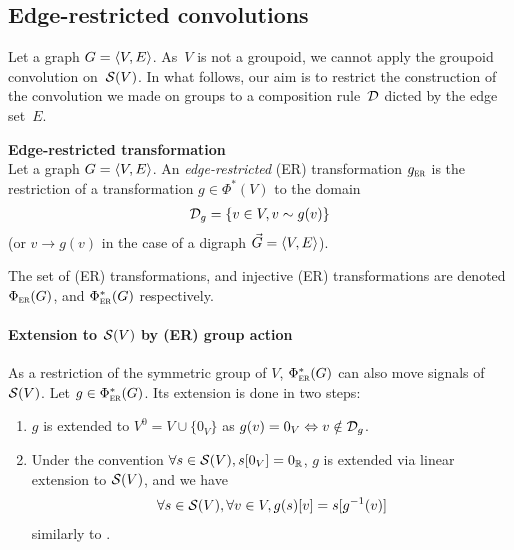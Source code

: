 

\subsection{Edge-restricted convolutions}

Let a graph $G = \langle V, E \rangle$. As~$V$ is not a groupoid, we cannot apply the groupoid convolution on~$\mathcal{S}(V)$. In what follows, our aim is to restrict the construction of the convolution we made on groups to a composition rule~$\mathcal{D}$ dicted by the edge set~$E$.

\begin{definition}\textbf{Edge-restricted transformation}\\
Let a graph $G = \langle V, E \rangle$. An \emph{edge-restricted} (ER) transformation $g_{\operatorname{\textsc{er}}}$ is the restriction of a transformation $g \in \Phi^*(V)$ to the domain
\begin{gather*}
\mathcal{D}_g = \{v \in V, v \sim g(v)\}
\end{gather*}
(or $v \rightarrow g(v)$ in the case of a digraph $\vec{G} = \langle V, E \rangle$).
\end{definition}

The set of (ER) transformations, and injective (ER) transformations are denoted $\Phi_{\operatorname{\textsc{er}}}(G)$, and $\Phi_{\operatorname{\textsc{er}}}^*(G)$ respectively.

\paragraph{Extension to $\mathcal{S}(V)$ by (ER) group action}
As a restriction of the symmetric group of $V$, $\Phi_{\operatorname{\textsc{er}}}^*(G)$ can also move signals of $\mathcal{S}(V)$. Let $g \in \Phi_{\operatorname{\textsc{er}}}^*(G)$. Its extension is done in two steps:
\begin{enumerate}
  \item $g$ is extended to $V^0 = V \cup \{0_V\}$ as $g(v) = 0_V \Leftrightarrow v \notin \mathcal{D}_g$.
  \item Under the convention $\forall s \in \mathcal{S}(V), s[0_V] = 0_{\mathbb{R}}$, $g$ is extended via linear extension to $\mathcal{S}(V)$, and we have
  \begin{gather*}
  \forall s \in \mathcal{S}(V), \forall v \in V, g(s)[v] = s[g^{-1}(v)]
  \end{gather*}
  similarly to .
\end{enumerate}


